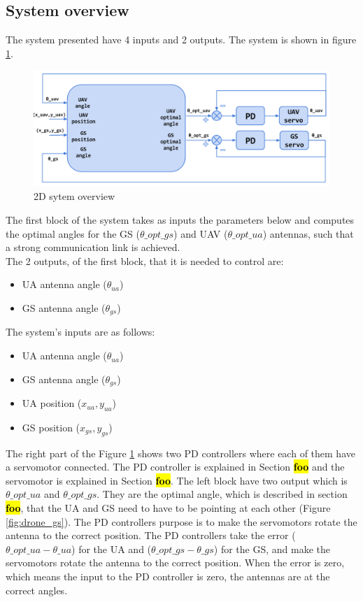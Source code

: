 \subsection{System overview}
The system presented have 4 inputs and 2 outputs. The system is shown in figure \ref{fig:2d_system}. 

\begin{figure}[h]
	\centering
	\includegraphics[scale=0.42]{figures/2d_system.png}
	\caption{2D sytem overview}
	\label{fig:2d_system}
\end{figure}
The first block of the system takes as inputs the parameters below and computes the optimal angles for the GS ($\theta\_opt\_gs$) and UAV ($\theta\_opt\_ua$) antennas, such that a strong communication link is achieved. \\

\noindent The 2 outputs, of the first block, that it is needed to control are:
\begin{itemize}
	\item UA antenna angle ($\theta_{ua}$)
	\item GS antenna angle ($\theta_{gs}$)
\end{itemize}

\noindent The system's inputs are as follows:
\begin{itemize}
	\item UA antenna angle ($\theta_{ua}$)
	\item GS antenna angle ($\theta_{gs}$)
	\item UA position ($x_{ua},y_{ua}$)
	\item GS position ($x_{gs},y_{gs}$)
\end{itemize}   

The right part of the Figure \ref{fig:2d_system} shows two PD controllers where each of them have a servomotor connected. The PD controller is explained in Section \hl{\textbf{foo}}  and the servomotor is explained in Section \hl{\textbf{foo}}. The left block have two output which is $\theta\_opt\_ua$ and $\theta\_opt\_gs$. They are the optimal angle, which is described in section \hl{\textbf{foo}}, that the UA and GS need to have to be pointing at each other (Figure \ref{fig:drone_gs}). The PD controllers purpose is to make the servomotors rotate the antenna to the correct position. The PD controllers take the error ($\theta\_opt\_ua - \theta\_ua$) for the UA and ($\theta\_opt\_gs - \theta\_gs$) for the GS, and make the servomotors rotate the antenna to the correct position. When the error is zero, which means the input to the PD controller is zero, the antennas are at the correct angles.

